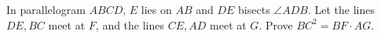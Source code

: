 In parallelogram $ABCD$, $E$ lies on $AB$ and $DE$ bisects $\angle ADB$. Let the lines $DE,BC$ meet at $F$, and the lines $CE,AD$ meet at $G$. Prove $BC^2=BF\cdot AG$.
